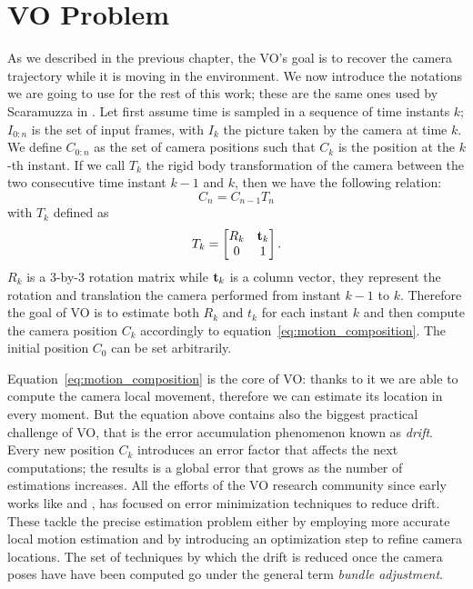 \section{VO Problem}
\label{sec:vo_problem}
As we described in the previous chapter, the VO's goal is to recover the 
camera trajectory while it is moving in the environment. We now
introduce the notations we are going to use for the rest of this work; 
these are the same ones used by Scaramuzza in \cite{scaramuzzaVisualOdometryI}.
Let first assume time is sampled in a sequence of time instants \(k\); 
\(I_{0:n} \) is the set of input frames, with \(I_{k}\) the picture taken by 
the camera at time
\(k\). We define \(C_{0:n}\) as the set of camera 
positions such that \(C_k\) is the position at the \(k\)-th instant.
If we call \(T_k\) the rigid body transformation of the camera between the two
consecutive time instant $k-1$ and $k$, then we have the following relation:
\begin{equation}
	\label{eq:motion_composition}
C_n = C_{n-1} T_n
\end{equation}
\noindent with \(T_k\) defined as
\begin{equation*}
	T_k =
	\begin{bmatrix}
	R_k & \mathbf{t}_k \\
	0 & 1
	\end{bmatrix} \text{.}
\end{equation*}
\noindent $R_k$ is a 3-by-3 rotation matrix while $\mathbf{t}_k$ is a column vector, 
they represent the rotation and translation the camera performed from instant 
$k-1$ to $k$.
Therefore the goal of VO is to estimate both $R_k$ and $t_k$ for each instant 
$k$ and then compute the camera position $C_k$ accordingly to 
equation~\ref{eq:motion_composition}.
The initial position $C_0$ can be set arbitrarily.

Equation~\ref{eq:motion_composition} is the core of VO: thanks to it we are able
to compute the camera local movement, therefore we can estimate its location in 
every moment. But the equation above contains also the biggest practical 
challenge of VO, that is the error accumulation phenomenon known as 
\textit{drift}.
Every new position $C_k$ introduces an error factor that affects the next 
computations; the results is a global error that grows as the number of 
estimations increases.
All the efforts of the VO research community since early works like 
\cite{harris19883d} and \cite{moravec1980obstacle}, has focused on error
minimization techniques to reduce drift.
These tackle the precise estimation problem either by employing more accurate
local motion estimation and by introducing an optimization step to refine 
camera locations.
The set of techniques by which the drift is reduced once the camera poses have 
have been computed go under the general term \textit{bundle adjustment}.

